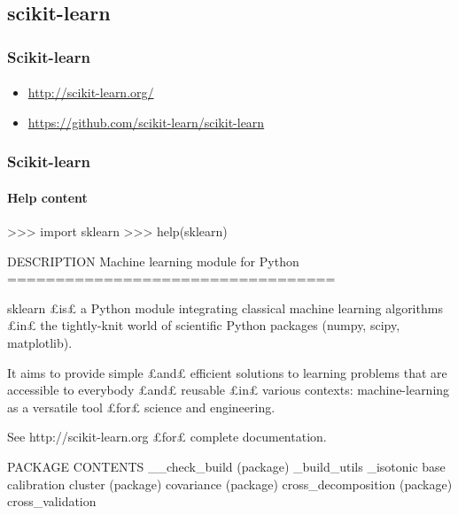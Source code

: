 \subsection{scikit-learn}
\begin{frame}[fragile]
\frametitle{Scikit-learn}
\framesubtitle{}
\begin{itemize}
 \item \url{http://scikit-learn.org/} 
 \item \url{https://github.com/scikit-learn/scikit-learn} 
\end{itemize}
\end{frame}
\begin{frame}[fragile]
\frametitle{Scikit-learn}
\framesubtitle{Help content}
\begin{pythonConsole}
>>> import sklearn
>>> help(sklearn)

DESCRIPTION
    Machine learning module for Python
    ==================================
    
    sklearn £is£ a Python module integrating classical machine
    learning algorithms £in£ the tightly-knit world of scientific Python
    packages (numpy, scipy, matplotlib).
    
    It aims to provide simple £and£ efficient solutions to learning problems
    that are accessible to everybody £and£ reusable £in£ various contexts:
    machine-learning as a versatile tool £for£ science and engineering.
    
    See http://scikit-learn.org £for£ complete documentation.

PACKAGE CONTENTS
    __check_build (package)
    _build_utils
    _isotonic
    base
    calibration
    cluster (package)
    covariance (package)
    cross_decomposition (package)
    cross_validation    
\end{pythonConsole}
\end{frame}
